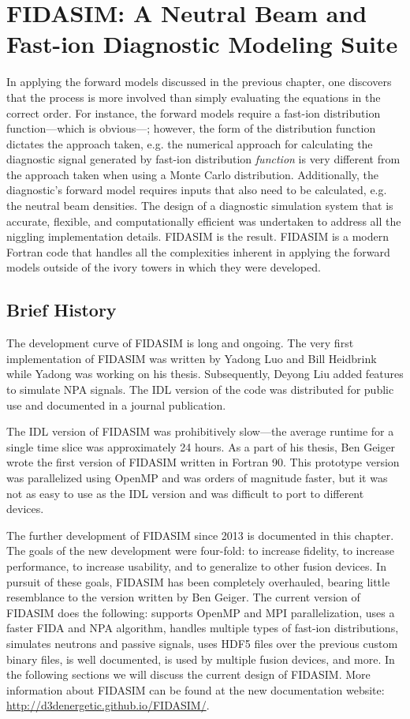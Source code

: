 \chapter{FIDASIM: A Neutral Beam and Fast-ion Diagnostic Modeling Suite}\label{chap:fidasim}
In applying the forward models discussed in the previous chapter, one discovers that the process is more involved than simply evaluating the equations in the correct order. For instance, the forward models require a fast-ion distribution function---which is obvious---; however, the form of the distribution function dictates the approach taken, e.g. the numerical approach for calculating the diagnostic signal generated by fast-ion distribution \textit{function} is very different from the approach taken when using a Monte Carlo distribution. Additionally, the diagnostic's forward model requires inputs that also need to be calculated, e.g. the neutral beam densities. The design of a diagnostic simulation system that is accurate, flexible, and computationally efficient was undertaken to address all the niggling implementation details. FIDASIM is the result. FIDASIM is a modern Fortran code that handles all the complexities inherent in applying the forward models outside of the ivory towers in which they were developed.  

\section{Brief History}
The development curve of FIDASIM is long and ongoing. 
The very first implementation of FIDASIM was written by Yadong Luo and Bill Heidbrink while Yadong was working on his thesis\cite{luo2007thesis}. Subsequently, Deyong Liu added features to simulate NPA signals. The IDL version of the code was distributed for public use and documented in a journal publication\cite{heidbrink2011code}.

The IDL version of FIDASIM was prohibitively slow---the average runtime for a single time slice was approximately 24 hours. As a part of his thesis\cite{geiger2013thesis}, Ben Geiger wrote the first version of FIDASIM written in Fortran 90. This prototype version was parallelized using OpenMP and was orders of magnitude faster, but it was not as easy to use as the IDL version and was difficult to port to different devices.

The further development of FIDASIM since 2013 is documented in this chapter. The goals of the new development were four-fold: to increase fidelity, to increase performance, to increase usability, and to generalize to other fusion devices. In pursuit of these goals, FIDASIM has been completely overhauled, bearing little resemblance to the version written by Ben Geiger. The current version of FIDASIM does the following: supports OpenMP and MPI parallelization, uses a faster FIDA and NPA algorithm, handles multiple types of fast-ion distributions, simulates neutrons and passive signals, uses HDF5 files over the previous custom binary files, is well documented, is used by multiple fusion devices, and more. In the following sections we will discuss the current design of FIDASIM. More information about FIDASIM can be found at the new documentation website: \url{http://d3denergetic.github.io/FIDASIM/}.

